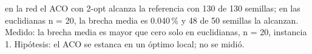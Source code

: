 {en la red el ACO con 2-opt alcanza la referencia con 130 de 130 semillas; en las euclidianas n = 20, la brecha media es 0.040\,\% y 48 de 50 semillas la alcanzan.}
{Medido: la brecha media es mayor que cero solo en euclidianas, n = 20, instancia 1. Hipótesis: el ACO se estanca en un óptimo local; no se midió.}
